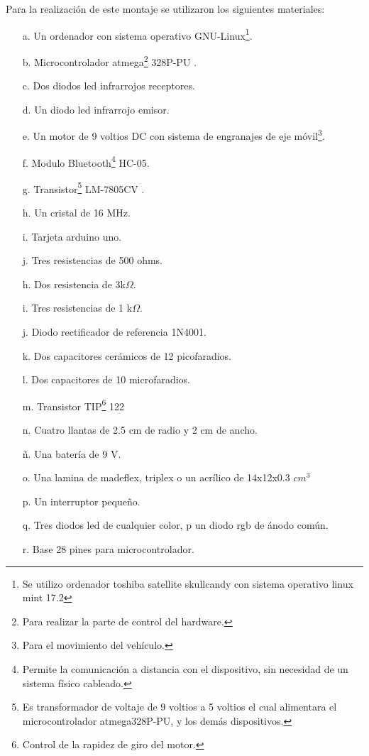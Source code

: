 \documentclass[12]{article}
\begin{document}
\begin{multicols}{2}
Para la realización de este montaje se utilizaron los siguientes materiales:
\begin{enumerate}
\item[a.] Un ordenador con sistema operativo GNU-Linux\footnote{Se utilizo ordenador toshiba satellite skullcandy con sistema operativo linux mint 17.2}.
\item[b.] Microcontrolador atmega\footnote{Para realizar la parte de control del hardware.} 328P-PU \cite{ARDUINO}.
\item[c.] Dos diodos led infrarrojos\cite{INFRARED} receptores.
\item[d.] Un diodo led infrarrojo\cite{INFRARED} emisor.
\item[e.] Un motor de 9 voltios DC con sistema de engranajes de eje móvil\footnote{Para el movimiento del vehículo.}.
\item[f.] Modulo Bluetooth\footnote{Permite la comunicación a distancia con el dispositivo, sin necesidad de un sistema físico cableado.} HC-05.
\item[g.] Transistor\footnote{Es transformador de voltaje de 9 voltios a 5 voltios el cual alimentara el microcontrolador atmega328P-PU, y los demás dispositivos.} LM-7805CV \cite{REGULADOR}.
\item[h.] Un cristal de 16 MHz.
\item[i.] Tarjeta arduino \cite{ARDUINO} uno.
\item[j.] Tres resistencias de 500 ohms.
\item[h.] Dos resistencia de 3k$\Omega$.
\item[i.] Tres resistencias de 1 k$\Omega$.
\item[j.] Diodo rectificador de referencia 1N4001. \cite{DIODO}
\item[k.] Dos capacitores cerámicos de 12 picofaradios.
\item[l.] Dos capacitores de 10 microfaradios.
\item[m.] Transistor TIP\footnote{Control de la rapidez de giro del motor.} 122\cite{TIP122}  
\item[n.] Cuatro llantas de 2.5 cm de radio y 2 cm de ancho.
\item[ñ.] Una batería de 9 V.
\item[o.] Una lamina de madeflex, triplex  o un acrílico de 14x12x0.3 $cm^{3}$
\item[p.] Un interruptor pequeño.
\item[q.] Tres diodos led de cualquier color, p un diodo rgb de ánodo común.
\item[r.] Base 28 pines para microcontrolador.
\end{enumerate}


\end{multicols}
\end{document}
